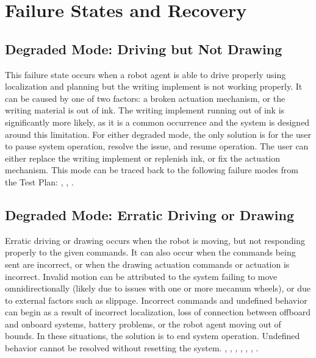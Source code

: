 
\section{Failure States and Recovery}
\label{sec:failure_states}
\subsection{Degraded Mode: Driving but Not Drawing}
This failure state occurs when a robot agent is able to drive properly using localization and planning but the writing implement is not working properly. It can be caused by one of two factors: a broken actuation mechanism, or the writing material is out of ink. The writing implement running out of ink is significantly more likely, as it is a common occurrence and the system is designed around this limitation. For either degraded mode, the only solution is for the user to pause system operation, resolve the issue, and resume operation. The user can either replace the writing implement or replenish ink, or fix the actuation mechanism. This mode can be traced back to the following failure modes from the Test Plan: , , .

\subsection{Degraded Mode: Erratic Driving or Drawing}
Erratic driving or drawing occurs when the robot is moving, but not responding properly to the given commands. It can also occur when the commands being sent are incorrect, or when the drawing actuation commands or actuation is incorrect. Invalid motion can be attributed to the system failing to move omnidirectionally (likely due to issues with one or more mecanum wheels), or due to external factors such as slippage. Incorrect commands and undefined behavior can begin as a result of incorrect localization, loss of connection between offboard and onboard systems, battery problems, or the robot agent moving out of bounds. In these situations, the solution is to end system operation. Undefined behavior cannot be resolved without resetting the system.  , , , , , , .

